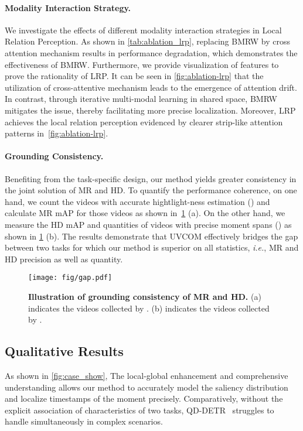 \documentclass[10pt,twocolumn,letterpaper]{article}
\begin{document}
\vspace{-12pt}
\paragraph{Modality Interaction Strategy.}
We investigate the effects of different modality interaction strategies in Local Relation Perception. As shown in \cref{tab:ablation_lrp}, replacing BMRW by cross attention mechanism results in  performance degradation, which demonstrates the effectiveness of BMRW.
Furthermore, we provide visualization of features to prove the rationality of LRP. It can be seen in \cref{fig:ablation-lrp} that the utilization of cross-attentive mechanism leads to the emergence of attention drift. In contrast, through iterative multi-modal learning in shared space, BMRW mitigates the issue, thereby facilitating more precise localization.
Moreover, LRP achieves the local relation perception evidenced by clearer strip-like attention patterns in~\cref{fig:ablation-lrp}.

\paragraph{Grounding Consistency.}
Benefiting from the task-specific design, our method yields greater consistency in the joint solution of MR and HD.
To quantify the performance coherence, on one hand, we count the videos with accurate hightlight-ness estimation () and calculate MR mAP for those videos as shown in~\cref{fig:gap} (a). 
On the other hand, we measure the HD mAP and quantities of videos with precise moment spans () as shown in \cref{fig:gap} (b). 
The results demonstrate that UVCOM effectively bridges the gap between two tasks for which our method is superior on all statistics, \textit{i.e.}, MR and HD precision as well as quantity.
\begin{figure}[t]
    \centering
    \texttt{[image: fig/gap.pdf]}
    \caption{\textbf{Illustration of grounding consistency of MR and HD.} (a) indicates the videos collected by . (b) indicates the videos collected by .}
    \label{fig:gap}
    \vspace{-10pt}
\end{figure}

\subsection{Qualitative Results}
As shown in \cref{fig:case_show}, The local-global enhancement and comprehensive understanding allows our method to accurately model the saliency distribution and localize timestamps of the moment precisely. Comparatively, without the explicit association of characteristics of two tasks, QD-DETR~\cite{qddetr} struggles to handle simultaneously in complex scenarios.  
\end{document}
